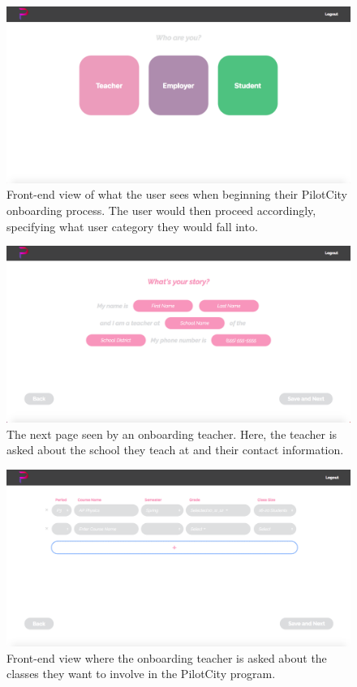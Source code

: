     \begin{figure}[H]
        \centering
        \includegraphics[scale=0.2]{type.png}
        \caption{Front-end view of what the user sees when beginning their PilotCity onboarding process. The user would then proceed accordingly, specifying what user category they would fall into.}
        \label{fig:usertype}
    \end{figure}

    \begin{figure}[H]
        \centering
        \includegraphics[scale=0.2]{story.png}
        \caption{The next page seen by an onboarding teacher. Here, the teacher is asked about the school they teach at and their contact information.}
        \label{fig:whatsurstory}
    \end{figure}
    
    \begin{figure}[H]
        \centering
        \includegraphics[scale=0.2]{classroom.png}
        \caption{Front-end view where the onboarding teacher is asked about the classes they want to involve in the PilotCity program.}
        \label{fig:describeclassroom}
    \end{figure}
    
